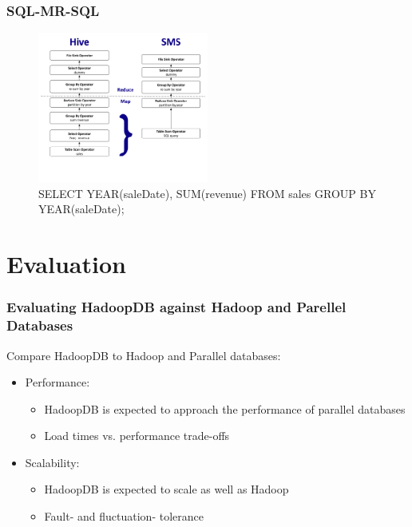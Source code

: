 \documentclass{beamer}
\begin{document}
\begin{frame}
  \frametitle{SQL-MR-SQL}
  \begin{figure}
    \centering
    \begin{center}
      \includegraphics[width=0.5\textwidth]{SQL-MR-SQL}
    \end{center}    
    \caption{   SELECT YEAR(saleDate), SUM(revenue) FROM sales GROUP BY YEAR(saleDate);
    }
  \end{figure}
\end{frame}

\section{Evaluation}
\label{sec:evaluation}


\begin{frame}
  \frametitle{Evaluating HadoopDB against Hadoop and Parellel Databases}
  Compare HadoopDB to Hadoop and Parallel databases:
  \begin{itemize}
  \item Performance:
    \begin{itemize}
    \item HadoopDB is expected to approach the performance of
      parallel databases
    \item Load times vs. performance trade-offs
    \end{itemize}
  \item Scalability:
    \begin{itemize}
    \item HadoopDB is expected to scale as well as Hadoop
    \item Fault- and fluctuation- tolerance
    \end{itemize}
  \end{itemize}
\end{frame}
\end{document}
